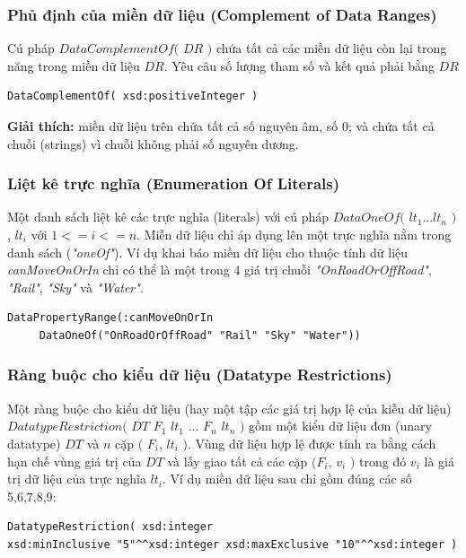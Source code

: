 \subsubsection{Phủ định của miền dữ liệu (Complement of Data Ranges)}
Cú pháp $DataComplementOf($ $DR$ $)$ chứa tất cả các miền dữ liệu còn lại trong năng trong miền dữ liệu $DR$. Yêu câu số lượng tham số và kết quả phải bằng $DR$
\begin{verbatim}
DataComplementOf( xsd:positiveInteger )
\end{verbatim}
\textbf{Giải thích:} miền dữ liệu trên chứa tất cả số nguyên âm, số 0; và chứa tất cả chuỗi (strings) vì chuỗi không phải số nguyên dương.

\subsubsection{Liệt kê trực nghĩa (Enumeration Of Literals)}
Một danh sách liệt kê các trực nghĩa (literals) với cú pháp $DataOneOf($ $lt_{1} ... lt_{n}$ $)$,  $lt_{i}$ với $1 <= i <= n$.  Miễn dữ liệu chỉ áp dụng lên một trực nghĩa nằm trong danh sách (\textit{"oneOf"}). Ví dụ khai báo miền dữ liệu cho thuộc tính dữ liệu \textit{canMoveOnOrIn} chỉ có thể là một trong 4 giá trị chuỗi \textit{"OnRoadOrOffRoad"}, \textit{"Rail"}, \textit{"Sky"} và \textit{"Water"}.
\begin{verbatim}
DataPropertyRange(:canMoveOnOrIn 
     DataOneOf("OnRoadOrOffRoad" "Rail" "Sky" "Water"))
\end{verbatim}

\subsubsection{Ràng buộc cho kiểu dữ liệu (Datatype Restrictions)}
Một ràng buộc cho kiểu dữ liệu (hay một tập các giá trị hợp lệ của kiễu dữ liệu) $DatatypeRestriction($ $DT$ $F_{1}$ $lt_{1}$ ... $F_{n}$ $lt_{n}$ $)$ gồm một kiểu dữ liệu đơn (unary datatype) $DT$ và $n$ cặp $($ $F_{i}$, $lt_{i}$ $)$. Vùng dữ liệu hợp lệ được tính ra bằng cách hạn chế vùng giá trị của $DT$ và lấy giao tất cả các cặp $(F_{i}$, $v_{i}$ $)$ trong đó $v_{i}$ là giá trị dữ liệu của trực nghĩa $lt_{i}$. Ví dụ miền dữ liệu sau chỉ gồm đúng các số 5,6,7,8,9:
\begin{verbatim}
DatatypeRestriction( xsd:integer 
xsd:minInclusive "5"^^xsd:integer xsd:maxExclusive "10"^^xsd:integer )
\end{verbatim}

